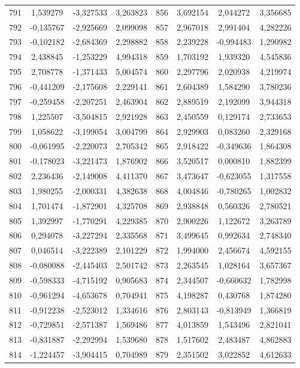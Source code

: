 \begin{apendicesenv}
\begin{table}[H]
\begin{tabular}{c c c c c c c c}
		791 & 1,539279 & -3,327533 & 3,263823 & 856 & 3,692154 & 2,044272 & 3,356685 \\
		792 & -0,135767 & -2,925669 & 2,099098 & 857 & 2,967018 & 2,991404 & 4,282226 \\
		793 & -0,102182 & -2,684369 & 2,298882 & 858 & 2,239228 & -0,994483 & 1,290982 \\
		794 & 2,438845 & -1,253229 & 4,994318 & 859 & 1,703192 & 1,939320 & 4,545836 \\
		795 & 2,708778 & -1,371433 & 5,004574 & 860 & 2,297796 & 2,020938 & 4,219974 \\
		796 & -0,441209 & -2,175608 & 2,229141 & 861 & 2,604389 & 1,584290 & 3,780236 \\
		797 & -0,259458 & -2,207251 & 2,463904 & 862 & 2,889519 & 2,192099 & 3,944318 \\
		798 & 1,225507 & -3,504815 & 2,921928 & 863 & 2,450559 & 0,129174 & 2,733653 \\
		799 & 1,058622 & -3,199054 & 3,004799 & 864 & 2,929903 & 0,083260 & 2,329168 \\
		800 & -0,061995 & -2,220073 & 2,705342 & 865 & 2,918422 & -0,349636 & 1,864308 \\
		801 & -0,178023 & -3,221473 & 1,876902 & 866 & 3,520517 & 0,000810 & 1,882399 \\
		802 & 2,236436 & -2,149008 & 4,411370 & 867 & 3,473647 & -0,623055 & 1,317558 \\
		803 & 1,980255 & -2,000331 & 4,382638 & 868 & 4,004846 & -0,780265 & 1,002832 \\
		804 & 1,701474 & -1,872901 & 4,325708 & 869 & 2,938848 & 0,560326 & 2,780521 \\
		805 & 1,392997 & -1,770291 & 4,229385 & 870 & 2,900226 & 1,122672 & 3,263789 \\
		806 & 0,294078 & -3,227294 & 2,335568 & 871 & 3,499645 & 0,992634 & 2,748340 \\
		807 & 0,046514 & -3,222389 & 2,101229 & 872 & 1,994000 & 2,456674 & 4,592155 \\
		808 & -0,080088 & -2,445403 & 2,501742 & 873 & 2,263545 & 1,028164 & 3,657367 \\
		809 & -0,598333 & -4,715192 & 0,905683 & 874 & 2,344507 & -0,660632 & 1,782998 \\
		810 & -0,961294 & -4,653678 & 0,704941 & 875 & 4,198287 & 0,430768 & 1,874280 \\
		811 & -0,912238 & -2,523012 & 1,334616 & 876 & 2,803143 & -0,813949 & 1,366819 \\
		812 & -0,729851 & -2,571387 & 1,569486 & 877 & 4,013859 & 1,543496 & 2,821041 \\
		813 & -0,831887 & -2,292994 & 1,539680 & 878 & 1,517602 & 2,483487 & 4,862883 \\
		814 & -1,224457 & -3,904415 & 0,704989 & 879 & 2,351502 & 3,022852 & 4,612633 \\
		\bottomrule
	\end{tabular}
\end{table}


\end{apendicesenv}
